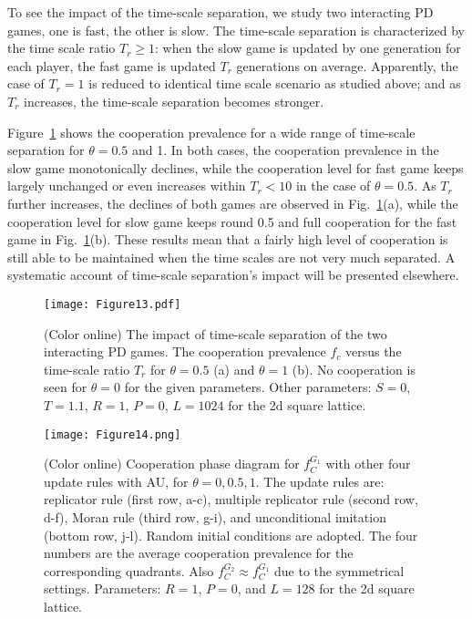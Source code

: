 \documentclass[showpacs,superscriptaddress,reprint,nofootinbib,amsmath,amssymb,aps,pre]{revtex4-1}
\begin{document}
To see the impact of the time-scale separation, we study two interacting PD games, one is fast, the other is slow. The time-scale separation is characterized by the time scale ratio $T_r\geq1$: when the slow game is updated by one generation for each player, the fast game is updated $T_r$ generations on average. Apparently, the case of $T_r=1$ is reduced to identical time scale scenario as studied above; and as $T_r$ increases, the time-scale separation becomes stronger.

Figure~\ref{fig:TSS}  shows the cooperation prevalence for a wide range of time-scale separation for $\theta=0.5$ and 1.
In both cases, the cooperation prevalence in the slow game monotonically declines, while the cooperation level for fast game keeps largely unchanged or even increases within $T_r<10$ in the case of $\theta=0.5$. As $T_r$ further increases, the declines of both games are observed in Fig.~\ref{fig:TSS}(a), while the cooperation level for slow game keeps round 0.5 and full cooperation for the fast game in Fig.~\ref{fig:TSS}(b). These results mean that  a fairly high level of cooperation is still able to be maintained when the time scales are not very much separated. A systematic account of time-scale separation's impact will be presented elsewhere.
 \begin{figure}[t]
\centering
\texttt{[image: Figure13.pdf]}
\caption{(Color online)
The impact of time-scale separation of the two interacting PD games.
The cooperation prevalence $f_c$ versus the time-scale ratio $T_r$ for $\theta=0.5$ (a) and $\theta=1$ (b). 
No cooperation is seen for $\theta=0$ for the given parameters.
Other parameters: $S=0$, $T=1.1$, $R=1$, $P=0$, $L=1024$ for the 2d square lattice.
}
\label{fig:TSS}
\end{figure}

\begin{figure*}
\centering
\texttt{[image: Figure14.png]}
\caption{(Color online)
Cooperation phase diagram for $f^{G_1}_C$ with other four update rules with AU, for $\theta=0,0.5,1$. 
The update rules are: replicator rule (first row, a-c), multiple replicator rule (second row, d-f), Moran rule (third row, g-i), and unconditional imitation (bottom row, j-l). 
Random initial conditions are adopted. The four numbers are the average cooperation prevalence for the corresponding quadrants.
Also $f^{G_2}_C\approx f^{G_1}_C$ due to the symmetrical settings.
Parameters: $R=1$, $P=0$, and $L=128$ for the 2d square lattice.
}
\label{fig:async}
\end{figure*}
\end{document}
